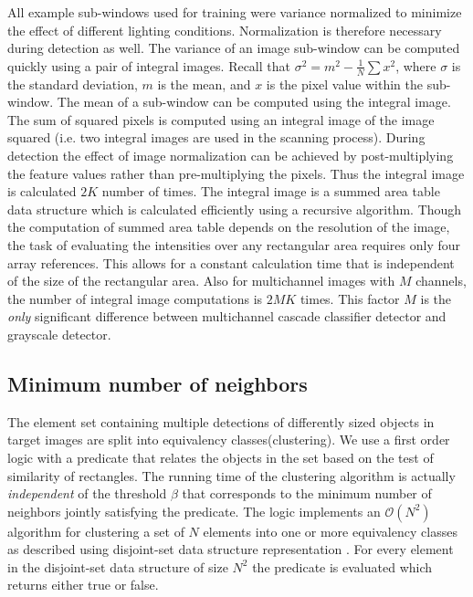 \noindent
All example sub-windows used for training were variance normalized to minimize the effect of different lighting conditions. Normalization is therefore necessary during
detection as well. The variance of an image sub-window can be computed quickly using a pair of integral images. Recall that $\sigma^2 = m^2 - \frac{1}{N}\sum x^2$, where $\sigma$ is the standard deviation, $m$ is the mean, and $x$ is the pixel value within the sub-window. The mean of a sub-window can be computed using the integral image. The sum of squared pixels is computed using an integral image of the image squared (i.e. two integral images are used in the scanning process). During detection the effect of image normalization can be achieved by post-multiplying the feature values rather than
pre-multiplying the pixels. Thus the integral image is calculated $2K$ number of times. The integral image is a summed area table data structure which is calculated  efficiently using a recursive algorithm. Though the computation of summed area table depends on the resolution of the image, the task of evaluating the intensities over any rectangular area requires only four array references. This allows for a constant calculation time that is independent of the size of the rectangular area. Also for multichannel images with $M$ channels, the number of integral image computations is $2MK$ times. This factor $M$ is the \textit{only} significant difference between multichannel cascade classifier detector and grayscale detector.

\subsection{Minimum number of neighbors}

The element set containing multiple detections of differently sized objects in target images are split into equivalency classes(clustering). We use a first order logic with a predicate that relates the objects in the set based on the test of similarity of rectangles. The running time of the clustering algorithm is actually \textit{independent} of the threshold $\beta$ that corresponds to the minimum number of neighbors jointly satisfying the predicate. The logic implements an $\mathcal{O}(N^2)$ algorithm for clustering a set of $N$ elements into one or more equivalency classes \cite{classifier1} as described using disjoint-set data structure representation \cite{classifier2}. For every element in the disjoint-set data structure of size $N^2$ the predicate is evaluated which returns either true or false. 


